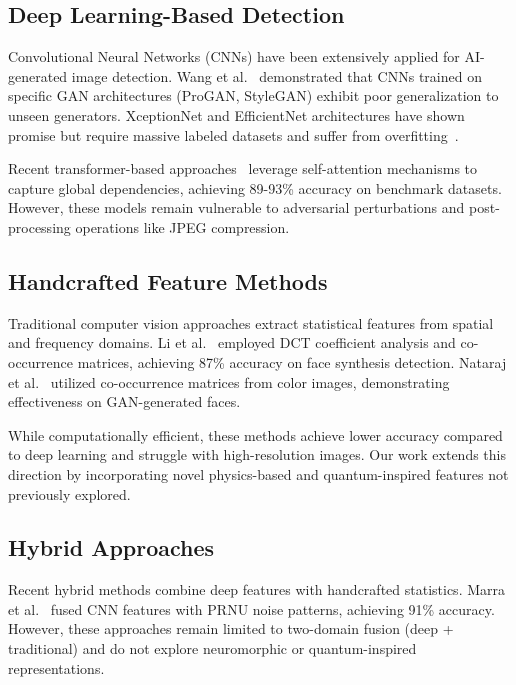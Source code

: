 \documentclass[runningheads]{llncs}
\begin{document}
\subsection{Deep Learning-Based Detection}

Convolutional Neural Networks (CNNs) have been extensively applied for AI-generated image detection. Wang et al.~\cite{wang2020cnn} demonstrated that CNNs trained on specific GAN architectures (ProGAN, StyleGAN) exhibit poor generalization to unseen generators. XceptionNet and EfficientNet architectures have shown promise but require massive labeled datasets and suffer from overfitting~\cite{rossler2019faceforensics}.

Recent transformer-based approaches~\cite{sha2023fake} leverage self-attention mechanisms to capture global dependencies, achieving 89-93\% accuracy on benchmark datasets. However, these models remain vulnerable to adversarial perturbations and post-processing operations like JPEG compression.

\subsection{Handcrafted Feature Methods}

Traditional computer vision approaches extract statistical features from spatial and frequency domains. Li et al.~\cite{li2020face} employed DCT coefficient analysis and co-occurrence matrices, achieving 87\% accuracy on face synthesis detection. Nataraj et al.~\cite{nataraj2019detecting} utilized co-occurrence matrices from color images, demonstrating effectiveness on GAN-generated faces.

While computationally efficient, these methods achieve lower accuracy compared to deep learning and struggle with high-resolution images. Our work extends this direction by incorporating novel physics-based and quantum-inspired features not previously explored.

\subsection{Hybrid Approaches}

Recent hybrid methods combine deep features with handcrafted statistics. Marra et al.~\cite{marra2019detection} fused CNN features with PRNU noise patterns, achieving 91\% accuracy. However, these approaches remain limited to two-domain fusion (deep + traditional) and do not explore neuromorphic or quantum-inspired representations.
\end{document}
